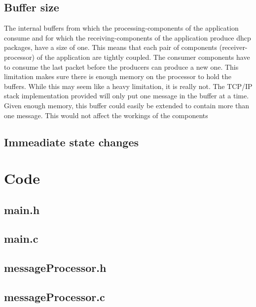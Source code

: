 \documentclass[11pt,a4paper]{scrartcl}
\begin{document}
\subsection{Buffer size}
The internal buffers from which the processing-components of the application consume and for which the receiving-components of the application produce dhcp packages, have a size of one. This means that each pair of components (receiver-processor) of the application are tightly coupled. The consumer components have to consume the last packet before the producers can produce a new one. This limitation makes sure there is enough memory on the processor to hold the buffers. While this may seem like a heavy limitation, it is really not. The TCP/IP stack implementation provided will only put one message in the buffer at a time.\\
Given enough memory, this buffer could easily be extended to contain more than one message. This would not affect the workings of the components 

\subsection{Immeadiate state changes}

\newpage

\appendix
\section{Code}

\subsection{main.h}


\subsection{main.c}


\subsection{messageProcessor.h}


\subsection{messageProcessor.c}

\end{document}
